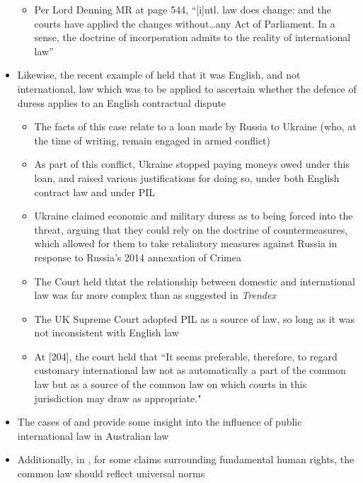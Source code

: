 \begin{itemize}
\begin{itemize}
        \item Per Lord Denning MR at page 544, ``[i]ntl. law does change: and the courts have applied the changes without…any Act of Parliament. In a sense, the doctrine of incorporation admits to the reality of international law''
    \end{itemize}
    \item Likewise, the recent example of  held that it was English, and not international, law which was to be applied to ascertain whether the defence of duress applies to an English contractual dispute
    \begin{itemize}
        \item The facts of this case relate to a loan made by Russia to Ukraine (who, at the time of writing, remain engaged in armed conflict)
        \item As part of this conflict, Ukraine stopped paying moneys owed under this loan, and raised various justifications for doing so, under both English contract law and under PIL
        \item Ukraine claimed economic and military duress as to being forced into the threat, arguing that they could rely on the doctrine of countermeasures, which allowed for them to take retaliatory measures against Russia in response to Russia's 2014 annexation of Crimea
        \item The Court held thtat the relationship between domestic and international law was far more complex than as suggested in \textit{Trendex}
        \item The UK Supreme Court adopted PIL as a source of law, so long as it was not inconsistent with English law
        \item At [204], the court held that ``It seems preferable, therefore, to regard customary international law not as automatically a part of the common law but as a source of the common law on which courts in this jurisdiction may draw as appropriate."
    \end{itemize}
    \item The cases of  and  provide some insight into the influence of public international law in Australian law
    \item Additionally, in , for some claims surrounding fundamental human rights, the common law should reflect universal norms
\end{itemize}

